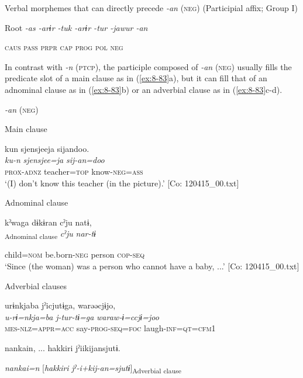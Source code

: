 \ea\label{ex:8-82}
  Verbal morphemes that can directly precede \textit{-an} (\textsc{neg}) (Participial affix; Group I)

  Root  \textit{-as  -arɨr  -tuk  -arɨr  -tur  -jawur  -an}

    \textsc{caus}  \textsc{pass}  \textsc{prpr}  \textsc{cap}  \textsc{prog}  \textsc{pol}  \textsc{neg}
\z

In contrast with \textit{-n} (\textsc{ptcp}), the participle composed of \textit{-an} (\textsc{neg}) usually fills the predicate slot of a main clause as in (\ref{ex:8-83}a), but it can fill that of an adnominal clause as in (\ref{ex:8-83}b) or an adverbial clause as in (\ref{ex:8-83}c-d).

\ea\label{ex:8-83}
  \textit{-an} (\textsc{neg})

  Main clause

\ea
{\TM}
\glll  kun  {\textbar}sjensjee{\textbar}ja  sijandoo.\\
\textit{ku-n}  \textit{sjensjee=ja}  \textit{sij-an=doo}\\
\textsc{prox}-\textsc{adnz}  teacher=\textsc{top}  know-\textsc{neg}=\textsc{ass}\\
\glt ‘(I) don’t know this teacher (in the picture).’ [Co: 120415\_00.txt]

  Adnominal clause

\ex
{\TM}
\glll  kˀwaga  dɨkɨran  cˀju  natɨ,\\
[\textit{kˀwa=ga}  \textit{dɨkɨr-an}]\textsubscript{Adnominal clause}  \textit{cˀju}  \textit{nar-tɨ}

      child=\textsc{nom}  be.born-\textsc{neg}  person  \textsc{cop}-\textsc{seq}\\
\glt ‘Since (the woman) was a person who cannot have a baby, ...’ [Co: 120415\_00.txt]

  Adverbial clauses

\ex
{\TM}
\glll  urɨnkjaba  jˀicjutɨga,  warəəcjɨjo,\\
\textit{u-rɨ=nkja=ba}  \textit{j-tur-tɨ=ga}  \textit{waraw-ɨ=ccjɨ=joo}\\
\textsc{mes}-\textsc{nlz}=\textsc{appr}=\textsc{acc}  say-\textsc{prog}-\textsc{seq}=\textsc{foc}  laugh-\textsc{inf}=\textsc{qt}=\textsc{cfm1}

      {\textbar}nankai{\textbar}n, ...  {\textbar}hakkiri{\textbar}  jˀiikijansjutɨ.

      \textit{nankai=n}  [\textit{hakkiri}  \textit{jˀ-i+kij-an=sjutɨ}]\textsubscript{Adverbial clause}

